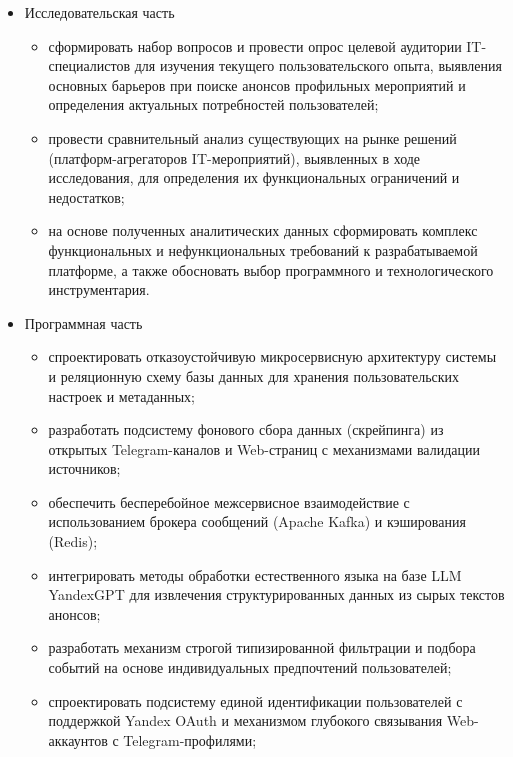 \begin{itemize}
  \item{Исследовательская часть}
    \begin{itemize}
        
    \item сформировать набор вопросов и провести опрос целевой аудитории IT-специалистов для изучения текущего пользовательского опыта, выявления основных барьеров при поиске анонсов профильных мероприятий и определения актуальных потребностей пользователей;

    \item провести сравнительный анализ существующих на рынке решений (платформ-агрегаторов IT-мероприятий), выявленных в ходе исследования, для определения их функциональных ограничений и недостатков;

    \item на основе полученных аналитических данных сформировать комплекс функциональных и нефункциональных требований к разрабатываемой платформе, а также обосновать выбор программного и технологического инструментария.

    \end{itemize}
  
  \item{Программная часть}
    \begin{itemize}
        
    \item спроектировать отказоустойчивую микросервисную архитектуру системы и реляционную схему базы данных для хранения пользовательских настроек и метаданных;
    
    \item разработать подсистему фонового сбора данных (скрейпинга) из открытых Telegram-каналов и Web-страниц с механизмами валидации источников;
    
    \item обеспечить бесперебойное межсервисное взаимодействие с использованием брокера сообщений (Apache Kafka) и кэширования (Redis);
    
    \item интегрировать методы обработки естественного языка на базе LLM YandexGPT для извлечения структурированных данных из сырых текстов анонсов;
    
    \item разработать механизм строгой типизированной фильтрации и подбора событий на основе индивидуальных предпочтений пользователей;
    
    \item спроектировать подсистему единой идентификации пользователей с поддержкой Yandex OAuth и механизмом глубокого связывания Web-аккаунтов с Telegram-профилями;
    

\end{itemize}
\end{itemize}
